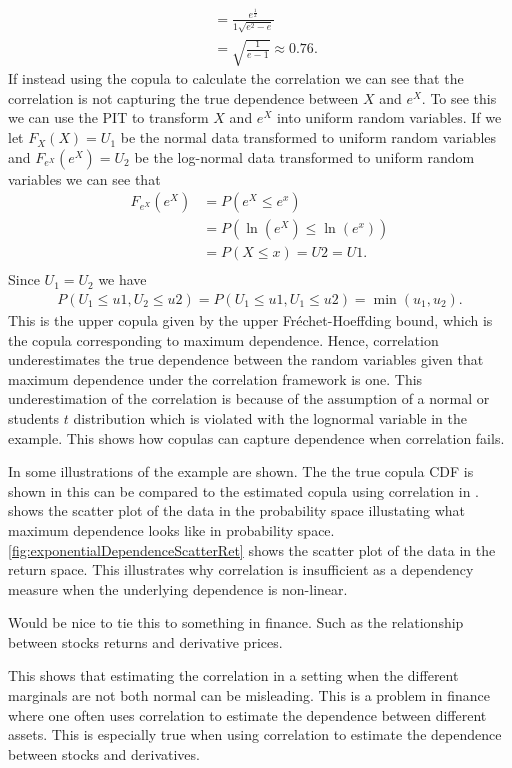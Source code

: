 \begin{example}
\begin{align*}
        & = \frac{e^{\frac{1}{2}}}{1\sqrt{e^2-e}}\\
        &=\sqrt{\frac{1}{e-1}} \approx 0.76. 
    \end{align*}
    If instead using the copula to calculate the correlation we can see that the correlation is not capturing the true dependence between $X$ and $e^X$. To see this we can use the \gls{PIT} to transform $X$ and $e^X$ into uniform random variables. If we let $F_X(X)=U_1$ be the normal data transformed to uniform random variables and $F_{e^X}(e^X)=U_2$ be the log-normal data transformed to uniform random variables we can see that 
    \begin{align*}
        F_{e^X}(e^X) &= P(e^X \leq e^x)\\
        &= P(\ln(e^X) \leq \ln (e^x))\\
        &=P(X\leq x) = U2 = U1.\\
    \end{align*}
    Since $U_1 = U_2$ we have 
    \begin{align*}
        P(U_1\leq u1, U_2\leq u2) = P(U_1\leq u1, U_1\leq u2) = \min(u_1,u_2).
    \end{align*}
    This is the upper copula given by the upper Fréchet-Hoeffding bound, which is the copula corresponding to maximum dependence. Hence, correlation underestimates the true dependence between the random variables given that maximum dependence under the correlation framework is one. This underestimation of the correlation is because of the assumption of a normal or students $t$ distribution which is violated with the lognormal variable in the example. This shows how copulas can capture dependence when correlation fails. 

    In  some illustrations of the example are shown. The the true copula \gls{CDF} is shown in  this can be compared to the estimated copula using correlation in .  shows the scatter plot of the data in the probability space illustating what maximum dependence looks like in probability space. \cref{fig:exponentialDependenceScatterRet} shows the scatter plot of the data in the return space. This illustrates why correlation is insufficient as a dependency measure when the underlying dependence is non-linear. 
    
    \begin{generalinstructions}
        Would be nice to tie this to something in finance. Such as the relationship between stocks returns and derivative prices.

        This shows that estimating the correlation in a setting when the different marginals are not both normal can be misleading. This is a problem in finance where one often uses correlation to estimate the dependence between different assets. This is especially true when using correlation to estimate the dependence between stocks and derivatives.
    \end{generalinstructions}
\end{example}
    
